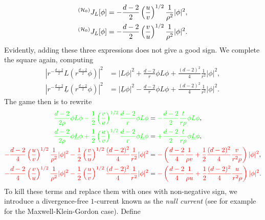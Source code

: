 	\begin{equation}
	\begin{split}
		{^{(\mathcal H_0)}} J_L [\phi]
			&= - \frac{d -2}{2} \left( \frac{u}{v} \right)^{1/2} \frac1{\rho^2} |\phi|^2, \\
		{^{(\mathcal H_0)}} J_L [\phi]
			&= - \frac{d -2}{2} \left( \frac{v}{u} \right)^{1/2} \frac1{\rho^2} |\phi|^2.	
	\end{split}
	\end{equation}
Evidently, adding these three expressions does not give a good sign. We complete the square again, computing 
	\begin{align*}
		\left| r^{- \frac{d - 2}{2}} L \left( r^{\frac{d - 2}{2}} \phi \right) \right|^2	
			&= |L\phi|^2 + \frac{d - 2}{r} \phi L \phi + \frac{(d - 2)^2}{4} \frac1{r^2} |\phi|^2, \\
		\left| r^{- \frac{d - 2}{2}}\underline L \left( r^{\frac{d - 2}{2}} \phi \right) \right|^2	
			&= |\underline L\phi|^2 - \frac{d - 2}{r} \phi L \phi + \frac{(d - 2)^2}{4} \frac1{r^2} |\phi|^2.
	\end{align*}	
The game then is to rewrite	
	\begin{align*}
		{\color{green} \frac{d - 2}{2\rho} \phi L \phi - \frac12 \left(\frac{v}{u} \right)^{1/2} \frac{d - 2}{r}  \phi L \phi}
			&= {\color{green} -\frac{d - 2}{2} \frac{t}{r \rho} \phi L \phi}, 
			\\
		{\color{green} \frac{d - 2}{2\rho}  \phi \underline L  \phi  + \frac12 \left(\frac{u}{v} \right)^{1/2} \frac{d - 2}{r}  \phi \underline L  \phi }
			&={\color{green} +\frac{d - 2}{2} \frac{t}{r \rho} \phi \underline L  \phi },
			\\
		{\color{red} -\frac{d - 2}{4} \left(  \frac{u}{v}\right)^{1/2} \frac{1}{\rho^2} |\phi|^2 - \frac12 \left(  \frac{v}{u}\right)^{1/2} \frac{(d - 2)^2}{4} \frac{1}{r^2} |\phi|^2 }	
			&= {\color{red} - \left(\frac{d - 2}{4}    \frac{1}{\rho v}  + \frac12  \frac{(d - 2)^2}{4} \frac{v}{r^2 \rho} \right) |\phi|^2},
			\\
		{\color{red} -\frac{d - 2}{4} \left(  \frac{v}{u}\right)^{1/2} \frac{1}{\rho^2} |\phi|^2 - \frac12 \left(  \frac{u}{v}\right)^{1/2} \frac{(d - 2)^2}{4} \frac{1}{r^2} |\phi|^2 }
			&= {\color{red}-\left( \frac{d - 2}{4}  \frac{1}{\rho u}  + \frac12 \frac{(d - 2)^2}{4} \frac{u}{r^2 \rho} \right) |\phi|^2}	.
	\end{align*}
To kill these terms and replace them with ones with non-negative sign, we introduce a divergence-free $1$-current known as the \emph{null current} (see for example \cite{OhTataru2016} for the Maxwell-Klein-Gordon case). Define 
